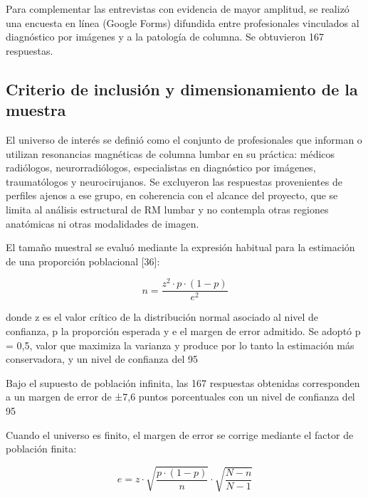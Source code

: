 Para complementar las entrevistas con evidencia de mayor amplitud, se realizó una encuesta en línea (Google Forms) difundida entre profesionales vinculados al diagnóstico por imágenes y a la patología de columna. Se obtuvieron 167 respuestas.

\subsection{Criterio de inclusión y dimensionamiento de la muestra}

El universo de interés se definió como el conjunto de profesionales que informan o utilizan resonancias magnéticas de columna lumbar en su práctica: médicos radiólogos, neurorradiólogos, especialistas en diagnóstico por imágenes, traumatólogos y neurocirujanos. Se excluyeron las respuestas provenientes de perfiles ajenos a ese grupo, en coherencia con el alcance del proyecto, que se limita al análisis estructural de RM lumbar y no contempla otras regiones anatómicas ni otras modalidades de imagen.

El tamaño muestral se evaluó mediante la expresión habitual para la estimación de una proporción poblacional [36]:

\[
n = \frac{z^2 \cdot p \cdot (1 - p)}{e^2}
\tag{10.1}
\]

donde z es el valor crítico de la distribución normal asociado al nivel de confianza, p la proporción esperada y e el margen de error admitido. Se adoptó p = 0,5, valor que maximiza la varianza y produce por lo tanto la estimación más conservadora, y un nivel de confianza del 95 %

Bajo el supuesto de población infinita, las 167 respuestas obtenidas corresponden a un margen de error de ±7,6 puntos porcentuales con un nivel de confianza del 95 %

Cuando el universo es finito, el margen de error se corrige mediante el factor de población finita:

\[
e = z \cdot \sqrt{\frac{p \cdot (1 - p)}{n}} \cdot \sqrt{\frac{N - n}{N - 1}}
\tag{10.2}
\]

